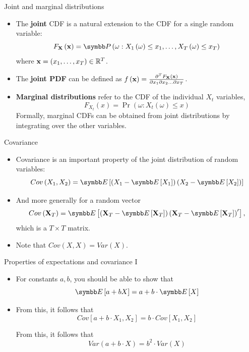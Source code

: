 \documentclass[aspectratio=169,11pt]{beamer}
\begin{document}
\begin{frame}{Joint and marginal distributions}
\begin{itemize}
\item The {\bf joint} CDF is a natural extension to the CDF for a single random variable:\[
		F_{{\bf X}} \left({\bf x}\right) = \Pr\left(\omega: X_1\left(\omega\right)\le x_1, \dots , X_T\left(\omega\right)\le x_T\right)
	\]
where ${\bf x} = \left(x_1,\dots,x_T\right)\in \mathbb{R}^T$.

\smallskip
\item The {\bf joint PDF} can be defined as $f\left( {\bf x} \right) = \frac{\partial^T F_{{\bf X}} \left({\bf x}\right)}{\partial x_1 \partial x_2 \dots \partial x_T}$.

\smallskip
\item {\bf Marginal distributions} refer to the CDF of the individual $X_t$ variables,\[
		F_{X_t} \left(x\right) = \Pr\left(\omega: X_t\left(\omega\right)\le x \right)
		\]
	Formally, marginal CDFs can be obtained  from joint distributions by integrating
		over the other variables. 


\end{itemize}
\end{frame}


\begin{frame}{Covariance}
\begin{itemize}
	\item Covariance is an important property of the joint distribution of random variables:\[
		Cov\left(X_1,X_2\right) = \E\left[ \left( X_1 - \E\left[X_1\right]\right) \left( X_2 - \E\left[X_2\right]\right)\right]
	\]

	\item And more generally for a random vector\[
		Cov\left({\bf X}_T\right) =\E\left[ \left( {\bf X}_T - \E\left[{\bf X}_T\right]\right) \left( {\bf X}_T - \E\left[{\bf X}_T\right]\right)'\right],
	\]
	which is a $T\times T$ matrix. 

	\item Note that $Cov\left(X,X\right) = Var\left(X\right)$.
\end{itemize}
\end{frame}




\begin{frame}{Properties of expectations and covariance I}
\begin{itemize}
	\item For constants $a,b$, you should be able to show that\[
		\E\left[ a + b X\right] = a + b \cdot \E\left[ X\right] 
	\]

	\medskip
	\item From this, it follows that\[
		Cov\left[ a + b \cdot X_1 , X_2 \right] = b \cdot Cov\left[X_1 , X_2 \right] 
	\]

	\medskip From this, it follows that\[
			Var\left(a + b \cdot X\right) = b^2 \cdot Var\left( X\right) 
	\]
\end{itemize}
\end{frame}
\end{document}
